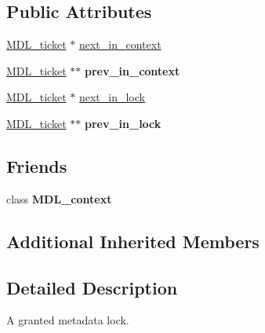 \subsection*{Public Attributes}
\begin{DoxyCompactItemize}
\item 
\mbox{\hyperlink{classMDL__ticket}{M\+D\+L\+\_\+ticket}} $\ast$ \mbox{\hyperlink{classMDL__ticket_a74155707577dfd12cc7f47229e4f0d17}{next\+\_\+in\+\_\+context}}
\item 
\mbox{\label{classMDL__ticket_a88281cdb21f74551799ae0940b89aed1}} 
\mbox{\hyperlink{classMDL__ticket}{M\+D\+L\+\_\+ticket}} $\ast$$\ast$ {\bfseries prev\+\_\+in\+\_\+context}
\item 
\mbox{\hyperlink{classMDL__ticket}{M\+D\+L\+\_\+ticket}} $\ast$ \mbox{\hyperlink{classMDL__ticket_ad9c009e5c097d2159dd142aa7f58e010}{next\+\_\+in\+\_\+lock}}
\item 
\mbox{\label{classMDL__ticket_a873d87712e75f3e7f58399575571198d}} 
\mbox{\hyperlink{classMDL__ticket}{M\+D\+L\+\_\+ticket}} $\ast$$\ast$ {\bfseries prev\+\_\+in\+\_\+lock}
\end{DoxyCompactItemize}
\subsection*{Friends}
\begin{DoxyCompactItemize}
\item 
\mbox{\label{classMDL__ticket_aab25f1f33d2f55eb5c79f0f7b6bfaecd}} 
class {\bfseries M\+D\+L\+\_\+context}
\end{DoxyCompactItemize}
\subsection*{Additional Inherited Members}


\subsection{Detailed Description}
A granted metadata lock.


